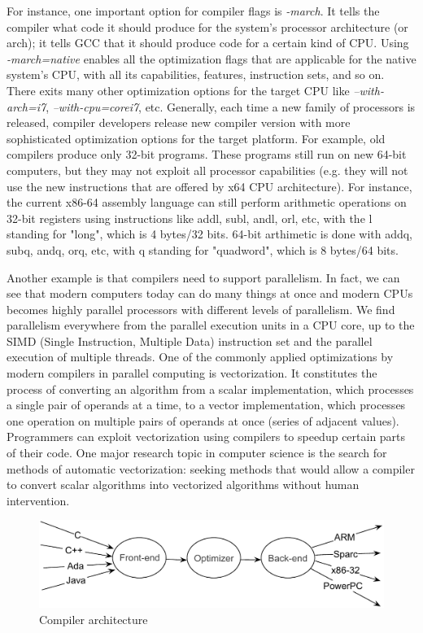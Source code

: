 For instance, one important option for compiler flags is \textit{-march}. It tells the compiler what code it should produce for the system's processor architecture (or arch); it tells GCC that it should produce code for a certain kind of CPU. Using \textit{-march=native} enables all the optimization flags that are applicable for the native system's CPU, with all its capabilities, features, instruction sets, and so on. There exits many other optimization options for the target CPU like \textit{--with-arch=i7}, \textit{--with-cpu=corei7}, etc.
Generally, each time a new family of processors is released, compiler developers release new compiler version with more sophisticated optimization options for the target platform. For example, old compilers produce only 32-bit programs. These programs still run on new 64-bit computers, but they may not exploit all processor capabilities (e.g. they will not use the new instructions that are offered by x64 CPU architecture). For instance, the current x86-64 assembly language can still perform arithmetic operations on 32-bit registers using instructions like addl, subl, andl, orl, etc, with the l standing for "long", which is 4 bytes/32 bits. 64-bit arthimetic is done with addq, subq, andq, orq, etc, with q standing for "quadword", which is 8 bytes/64 bits.

Another example is that compilers need to support parallelism. In fact, we can see that modern computers today can do many things at once and modern CPUs becomes highly parallel processors with different levels of parallelism. We find parallelism everywhere from the parallel execution units in a CPU core, up to the SIMD (Single Instruction, Multiple Data) instruction set and the parallel execution of multiple threads.  One of the commonly applied optimizations by modern compilers in parallel computing is vectorization. It constitutes the process of converting an algorithm from a scalar implementation, which processes a single pair of operands at a time, to a vector implementation, which processes one operation on multiple pairs of operands at once (series of adjacent values).
Programmers can exploit vectorization using compilers to speedup certain parts of their code. One major research topic in computer science is the search for methods of automatic vectorization: seeking methods that would allow a compiler to convert scalar algorithms into vectorized algorithms without human intervention.
\begin{figure}[h]
	\center
	\includegraphics[scale=0.65]{Background/fig/compilers}
	\caption{Compiler architecture}
	\label{fig:compilers}
\end{figure}

